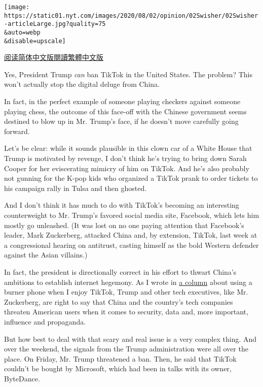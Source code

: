 \texttt{[image: https://static01.nyt.com/images/2020/08/02/opinion/02Swisher/02Swisher-articleLarge.jpg?quality=75\\\&auto=webp\\\&disable=upscale]}

\href{https://cn.nytimes.com/opinion/20200804/tik-tok-china-trump/}{阅读简体中文版}\href{https://cn.nytimes.com/opinion/20200804/tik-tok-china-trump/zh-hant/}{閱讀繁體中文版}

Yes, President Trump \emph{can} ban TikTok in the United States. The
problem? This won't actually stop the digital deluge from China.

In fact, in the perfect example of someone playing checkers against
someone playing chess, the outcome of this face-off with the Chinese
government seems destined to blow up in Mr. Trump's face, if he doesn't
move carefully going forward.

Let's be clear: while it sounds plausible in this clown car of a White
House that Trump is motivated by revenge, I don't think he's trying to
bring down Sarah Cooper for her eviscerating mimicry of him on TikTok.
And he's also probably not gunning for the K-pop kids who organized a
TikTok prank to order tickets to his campaign rally in Tulsa and then
ghosted.

And I don't think it has much to do with TikTok's becoming an
interesting counterweight to Mr. Trump's favored social media site,
Facebook, which lets him mostly go unleashed. (It was lost on no one
paying attention that Facebook's leader, Mark Zuckerberg, attacked China
and, by extension, TikTok, last week at a congressional hearing on
antitrust, casting himself as the bold Western defender against the
Asian villains.)

In fact, the president is directionally correct in his effort to thwart
China's ambitions to establish internet hegemony. As I wrote in
\href{https://www.nytimes.com/2020/07/17/opinion/tiktok-ban-china.html}{a
column} about using a burner phone when I enjoy TikTok, Trump and other
tech executives, like Mr. Zuckerberg, are right to say that China and
the country's tech companies threaten American users when it comes to
security, data and, more important, influence and propaganda.

But how best to deal with that scary and real issue is a very complex
thing. And over the weekend, the signals from the Trump administration
were all over the place. On Friday, Mr. Trump threatened a ban. Then, he
said that TikTok couldn't be bought by Microsoft, which had been in
talks with its owner, ByteDance.

